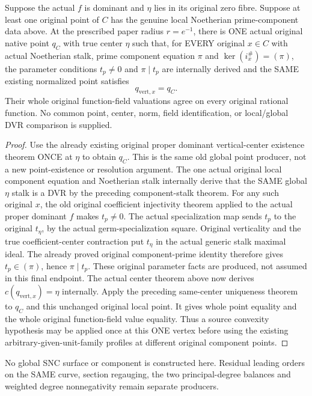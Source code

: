 \begin{theorem}
\label{thm:gauss-common-one-original-vertical-point}
\leanok
Suppose the actual $f$ is dominant and $\eta$ lies in its original
zero fibre. Suppose at least one original point of $C$ has the genuine
local Noetherian prime-component data above. At the prescribed paper
radius $r=e^{-1}$, there is ONE actual original native point $q_C$ with
true center $\eta$ such that, for EVERY original $x\in C$ with actual
Noetherian stalk, prime component equation $\pi$ and
$\ker(i_x^\#)=(\pi)$, the parameter conditions $t_p\ne0$ and
$\pi\mid t_p$ are internally derived and the SAME existing normalized point satisfies
\[
 q_{\mathrm{vert},x}=q_C.
\]
Their whole original function-field valuations agree on every original
rational function. No common point, center, norm, field identification,
or local/global DVR comparison is supplied.
\end{theorem}
\begin{proof}
Use the already existing original proper dominant vertical-center
existence theorem ONCE at $\eta$ to obtain $q_C$. This is the same old
global point producer, not a new point-existence or resolution argument.
The one actual original local component equation and Noetherian stalk
internally derive that the SAME global $\eta$ stalk is a DVR by the
preceding component-stalk theorem.
For any such original $x$, the old original coefficient injectivity
theorem applied to the actual proper dominant $f$ makes $t_p\ne0$.
The actual specialization map sends $t_p$ to the original $t_\eta$,
by the actual germ-specialization square. Original verticality and the
true coefficient-center contraction put $t_\eta$ in the actual generic
stalk maximal ideal. The already proved original component-prime identity
therefore gives $t_p\in(\pi)$, hence $\pi\mid t_p$.
These original parameter facts are produced, not assumed in this final
endpoint. The actual center theorem above now derives
$c(q_{\mathrm{vert},x})=\eta$ internally.
Apply the preceding same-center uniqueness theorem to $q_C$ and this
unchanged original local point. It gives whole point equality and the
whole original function-field value equality. Thus a source convexity
hypothesis may be applied once at this ONE vertex before using the
existing arbitrary-given-unit-family profiles at different original
component points.
\end{proof}

No global SNC surface or component is constructed here. Residual leading
orders on the SAME curve, section regauging, the two principal-degree
balances and weighted degree nonnegativity remain separate producers.
